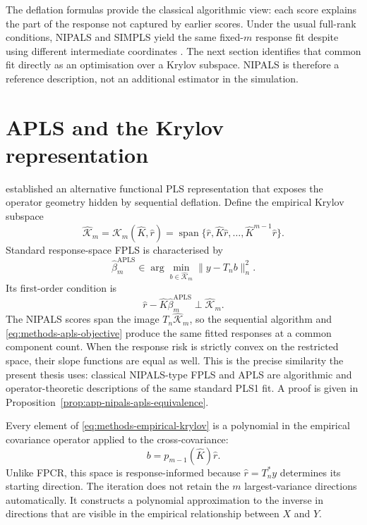 The deflation formulas provide the classical algorithmic view: each score
explains the part of the response not captured by earlier scores.  Under the
usual full-rank conditions, NIPALS and SIMPLS yield the same fixed-$m$
response fit despite using different intermediate coordinates
\parencite{dejong_1993}.  The next section identifies that common fit directly
as an optimisation over a Krylov subspace.  NIPALS is therefore a reference
description, not an additional estimator in the simulation.

\section{APLS and the Krylov representation}
\label{sec:methods-apls}

\textcite{delaigle_hall_2012} established an alternative functional PLS
representation that exposes the operator geometry hidden by sequential
deflation.  Define the empirical Krylov subspace
\begin{equation}
    \widehat{\mathcal K}_m
    =\mathcal K_m(\widehat K,\widehat r)
    =\operatorname{span}\{\widehat r,\widehat K\widehat r,
      \ldots,\widehat K^{m-1}\widehat r\}.
    \label{eq:methods-empirical-krylov}
\end{equation}
Standard response-space FPLS is characterised by
\begin{equation}
    \widehat\beta_m^{\mathrm{APLS}}
    \in\arg\min_{b\in\widehat{\mathcal K}_m}
      \|y-T_nb\|_n^2.
    \label{eq:methods-apls-objective}
\end{equation}
Its first-order condition is
\begin{equation}
    \widehat r-\widehat K\widehat\beta_m^{\mathrm{APLS}}
    \perp\widehat{\mathcal K}_m.
    \label{eq:methods-apls-galerkin}
\end{equation}
The NIPALS scores span the image
$T_n\widehat{\mathcal K}_m$, so the sequential algorithm and
\eqref{eq:methods-apls-objective} produce the same fitted responses at a
common component count.  When the response risk is strictly convex on the
restricted space, their slope functions are equal as well.  This is the
precise similarity the present thesis uses: classical NIPALS-type FPLS and
APLS are algorithmic and operator-theoretic descriptions of the same
standard PLS1 fit.  A proof is given in
Proposition~\ref{prop:app-nipals-apls-equivalence}.

Every element of \eqref{eq:methods-empirical-krylov} is a polynomial in the
empirical covariance operator applied to the cross-covariance:
\begin{equation}
    b=p_{m-1}(\widehat K)\widehat r.
    \label{eq:methods-krylov-polynomial}
\end{equation}
Unlike FPCR, this space is response-informed because
$\widehat r=T_n^*y$ determines its starting direction.  The iteration does
not retain the $m$ largest-variance directions automatically.  It constructs
a polynomial approximation to the inverse in directions that are visible in
the empirical relationship between $X$ and $Y$.

